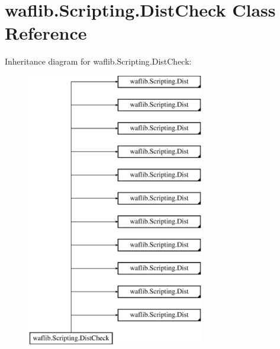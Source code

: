 \hypertarget{classwaflib_1_1_scripting_1_1_dist_check}{}\section{waflib.\+Scripting.\+Dist\+Check Class Reference}
\label{classwaflib_1_1_scripting_1_1_dist_check}
Inheritance diagram for waflib.\+Scripting.\+Dist\+Check\+:\begin{figure}[H]
\begin{center}
\leavevmode
\includegraphics[height=12.000000cm]{classwaflib_1_1_scripting_1_1_dist_check}
\end{center}
\end{figure}
